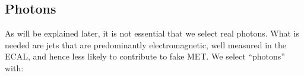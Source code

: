 \begin{itemize}

\end{itemize}


\subsection{Photons}
\label{sec:phosel}

As will be explained later, it is not essential that we select real photons. 
What is needed are jets that are predominantly electromagnetic, well measured in the ECAL, and hence less likely to contribute to fake MET. We select ``photons'' with:

